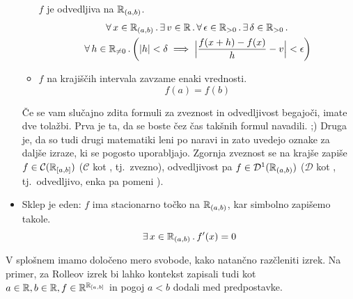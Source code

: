 \begin{itemize}
\begin{itemize}
                                        $f$ je odvedljiva na ${\mathbb{R}}_{(a, b)}$.
                                        \begin{multline*}
                                                \xall{x}[\intoo{a}{b}]{
                                                        \xsome{v}[\RR]{
                                                                \xall{\epsilon}[\RR_{> 0}]{
                                                                        \xsome{\delta}[\RR_{> 0}]{
                                                                        }
                                                                }
                                                        }
                                                }\\
                                                \all{h}[\RR_{\neq 0}]{
                                                        |h| < \delta \implies \Big|\frac{f(x + h) - f(x)}{h} - v\Big| < \epsilon
                                                }
                                        \end{multline*}
                                \item
                                        $f$ na krajiščih intervala zavzame enaki vrednosti.
                                        \[f(a) = f(b)\]
                        \end{itemize}
                        Če se vam slučajno zdita formuli za zveznost in odvedljivost begajoči, imate dve tolažbi. Prva je ta, da se boste čez čas takšnih formul navadili. ;) Druga je, da so tudi drugi matematiki leni po naravi in zato uvedejo oznake za daljše izraze, ki se pogosto uporabljajo. Zgornja zveznost se na krajše zapiše $f \in \mathcal{C}({\mathbb{R}}_{[a, b]})$ ($\mathcal{C}$ kot , tj.~zvezno), odvedljivost pa $f \in \mathcal{D}^1({\mathbb{R}}_{(a, b)})$ ($\mathcal{D}$ kot , tj.~odvedljivo, enka pa pomeni ).
                \item
                        Sklep je eden: $f$ ima stacionarno točko na ${\mathbb{R}}_{(a, b)}$, kar simbolno zapišemo takole.
                        \[\xsome{x}[\intoo{a}{b}]{f'(x) = 0}\]
        \end{itemize}

        V splošnem imamo določeno mero svobode, kako natančno razčleniti izrek. Na primer, za Rolleov izrek bi lahko kontekst zapisali tudi kot $a \in \mathbb{R}, b \in \mathbb{R}, f \in \mathbb{R}^{{\mathbb{R}}_{[a, b]}}$ in pogoj $a < b$ dodali med predpostavke.

